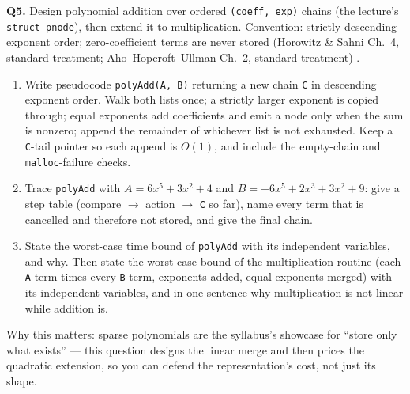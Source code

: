 \documentclass[11pt]{article}
\begin{document}
\textbf{Q5.} Design polynomial addition over ordered \texttt{(coeff, exp)} chains (the lecture's \texttt{struct pnode}), then extend it to multiplication. Convention: strictly descending exponent order; zero-coefficient terms are never stored (Horowitz \& Sahni Ch.~4, standard treatment; Aho--Hopcroft--Ullman Ch.~2, standard treatment) \cite{HorowitzSahni2008_fundamentals_data_structures,AhoHopcroftUllman1983_data_structures_algorithms}.
\begin{enumerate}
  \item[(a)] Write pseudocode \texttt{polyAdd(A, B)} returning a new chain \texttt{C} in descending exponent order. Walk both lists once; a strictly larger exponent is copied through; equal exponents add coefficients and emit a node only when the sum is nonzero; append the remainder of whichever list is not exhausted. Keep a \texttt{C}-tail pointer so each append is $O(1)$, and include the empty-chain and \texttt{malloc}-failure checks.
  \item[(b)] Trace \texttt{polyAdd} with $A = 6x^{5} + 3x^{2} + 4$ and $B = -6x^{5} + 2x^{3} + 3x^{2} + 9$: give a step table (compare $\to$ action $\to$ \texttt{C} so far), name every term that is cancelled and therefore not stored, and give the final chain.
  \item[(c)] State the worst-case time bound of \texttt{polyAdd} with its independent variables, and why. Then state the worst-case bound of the multiplication routine (each \texttt{A}-term times every \texttt{B}-term, exponents added, equal exponents merged) with its independent variables, and in one sentence why multiplication is not linear while addition is.
\end{enumerate}
Why this matters: sparse polynomials are the syllabus's showcase for ``store only what exists'' --- this question designs the linear merge and then prices the quadratic extension, so you can defend the representation's cost, not just its shape.
\end{document}

